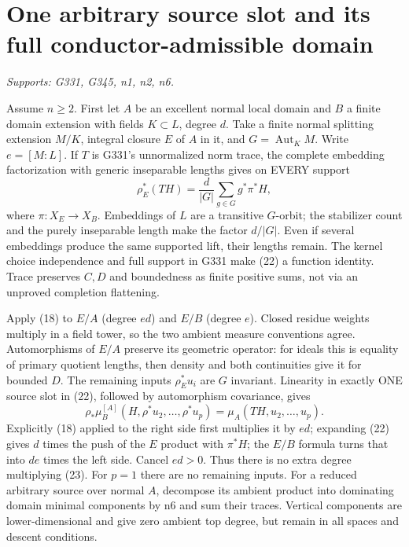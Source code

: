 \documentclass[11pt]{article}
\begin{document}
\section{One arbitrary source slot and its full conductor-admissible domain}
\textit{Supports: G331, G345, n1, n2, n6.}

Assume $n\ge2$. First let $A$ be an excellent normal local domain and $B$ a finite domain extension with fields $K\subset L$, degree $d$. Take a finite normal splitting extension $M/K$, integral closure $E$ of $A$ in it, and $G=\operatorname{Aut}_K M$. Write $e=[M:L]$. If $T$ is G331's unnormalized norm trace, the complete embedding factorization with generic inseparable lengths gives on EVERY support
\[
\rho_E^*(TH)=\frac d{|G|}\sum_{g\in G} g^*\pi^*H,     \tag{22}
\]
where $\pi:X_E\to X_B$. Embeddings of $L$ are a transitive $G$-orbit; the stabilizer count and the purely inseparable length make the factor $d/|G|$. Even if several embeddings produce the same supported lift, their lengths remain. The kernel choice independence and full support in G331 make (22) a function identity. Trace preserves $C,D$ and boundedness as finite positive sums, not via an unproved completion flattening.

Apply (18) to $E/A$ (degree $ed$) and $E/B$ (degree $e$). Closed residue weights multiply in a field tower, so the two ambient measure conventions agree. Automorphisms of $E/A$ preserve its geometric operator: for ideals this is equality of primary quotient lengths, then density and both continuities give it for bounded $D$. The remaining inputs $\rho_E^*u_i$ are $G$ invariant. Linearity in exactly ONE source slot in (22), followed by automorphism covariance, gives
\[
\rho_*\mu_B^{[A]}(H,\rho^*u_2,\ldots,\rho^*u_p)
=\mu_A(TH,u_2,\ldots,u_p).                            \tag{23}
\]
Explicitly (18) applied to the right side first multiplies it by $ed$; expanding (22) gives $d$ times the push of the $E$ product with $\pi^*H$; the $E/B$ formula turns that into $de$ times the left side. Cancel $ed>0$. Thus there is no extra degree multiplying (23). For $p=1$ there are no remaining inputs. For a reduced arbitrary source over normal $A$, decompose its ambient product into dominating domain minimal components by n6 and sum their traces. Vertical components are lower-dimensional and give zero ambient top degree, but remain in all spaces and descent conditions.
\end{document}
